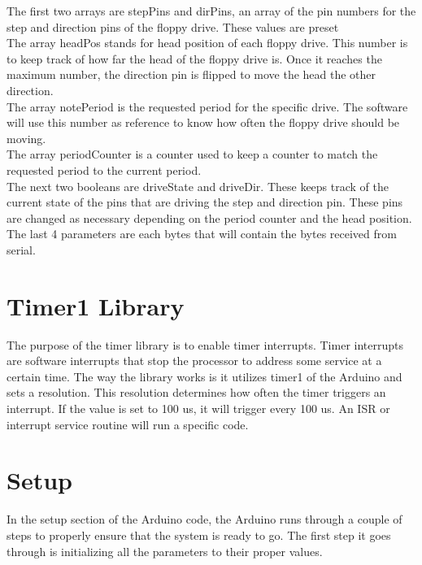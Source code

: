 \documentclass[11pt, a4paper]{report}
\begin{document}
The first two arrays are stepPins and dirPins, an array of the pin numbers for the step and direction pins of the floppy drive. These values are preset\\

The array headPos stands for head position of each floppy drive. This number is to keep track of how far the head of the floppy drive is. Once it reaches the maximum number, the direction pin is flipped to move the head the other direction. \\

The array notePeriod is the requested period for the specific drive. The software will use this number as reference to know how often the floppy drive should be moving.\\

The array periodCounter is a counter used to keep a counter to match the requested period to the current period. \\

The next two booleans are driveState and driveDir. These keeps track of the current state of the pins that are driving the step and direction pin. These pins are changed as necessary depending on the period counter and the head position. \\

The last 4 parameters are each bytes that will contain the bytes received from serial. \\

\section{Timer1 Library}

The purpose of the timer library is to enable timer interrupts. Timer interrupts are software interrupts that stop the processor to address some service at a certain time. The way the library works is it utilizes timer1 of the Arduino and sets a resolution. This resolution determines how often the timer triggers an interrupt. If the value is set to 100 us, it will trigger every 100 us. An ISR or interrupt service routine will run a specific code.

\section{Setup}

In the setup section of the Arduino code, the Arduino runs through a couple of steps to properly ensure that the system is ready to go. The first step it goes through is initializing all the parameters to their proper values. \\
\end{document}
